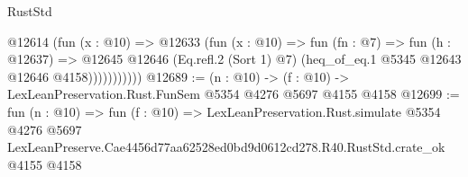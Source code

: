 \begin{lexlean}{RustStd}
\begin{coremodule}
                  @12614
                    (fun (x : @10) =>
                    @12633
                      (fun (x : @10) =>
                      fun (fn : @7) =>
                      fun (h : @12637) =>
                      @12645
                        @12646
                        (Eq.refl.{2} (Sort 1) @7)
                        (heq_of_eq.{1} @5345 @12643 @12646 @4158)))))))))))
@12689 := (n : @10) -> (f : @10) -> LexLeanPreservation.Rust.FunSem @5354 @4276 @5697 @4155 @4158
@12699 := fun (n : @10) =>
  fun (f : @10) =>
  LexLeanPreservation.Rust.simulate
    @5354
    @4276
    @5697
    LexLeanPreserve.Cae4456d77aa62528ed0bd9d0612cd278.R40.RustStd.crate_ok
    @4155
    @4158
\end{coremodule}
\end{lexlean}
